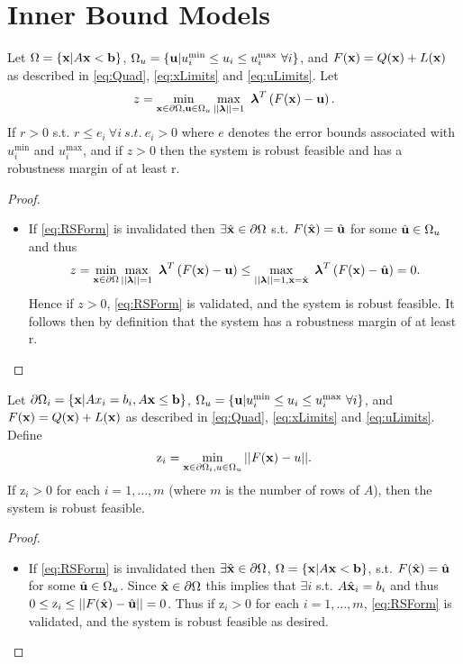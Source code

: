\section{Inner Bound Models} \label{sec:inbdform}  

\begin{thm}
Let $\Omega=\{\mathbf{x}| A\mathbf{x}< \mathbf{b}\}$, $\Omega_{u}=\{\mathbf{u}| u^{\min}_i\leq u_i \leq u^{\max}_i \ \forall i \}$, and $F(\mathbf{x})=Q(\mathbf{x})+L(\mathbf{x})$ as described in \eqref{eq:Quad}, \eqref{eq:xLimits} and \eqref{eq:uLimits}. 
Let
$$z = \min\limits_{\vx\in \partial \Omega, \vu\in \Omega_{u} }\max\limits_{||\boldsymbol{\lambda}||=1}\ \boldsymbol{\lambda}^T\left(F(\vx)-\vu\right).$$
If $r>0$ s.t. $r\leq e_i \ \forall i \ s.t. \ e_i>0$ where $e$ denotes the error bounds associated with $ u^{\min}_i$ and $ u^{\max}_i$, and if $z>0$ then the system is robust feasible and has a robustness margin of at least r.

\begin{proof} 
\begin{itemize}
\item[] If \eqref{eq:RSForm} is invalidated then $\exists \hat{\mathbf{x}}\in\partial\Omega$ s.t. $F(\hat{\mathbf{x}})=\hat{\mathbf{u}}$ for some $\hat{\mathbf{u}}\in\Omega_{u}$ and thus $$z = \min\limits_{\vx\in \partial \Omega}\max\limits_{||\boldsymbol{\lambda}||=1}\ \boldsymbol{\lambda}^T\left(F(\vx)-\vu\right)\leq \max\limits_{||\boldsymbol{\lambda}||=1, \vx=\hat{\vx}}\ \boldsymbol{\lambda}^T\left(F(\vx)-\hat{\vu}\right)=0.$$ 
Hence if $z>0$, \eqref{eq:RSForm} is validated, and the system is robust feasible. It follows then by definition that the system has a robustness margin of at least r.
\end{itemize}
\end{proof}
\end{thm}

\begin{thm} \label{thm:RobFeas}
Let $\partial\Omega_i=\{\mathbf{x}| Ax_i = b_i, A\mathbf{x}\leq \mathbf{b}\}$, $\Omega_{u}=\{\mathbf{u}| u^{\min}_i\leq u_i \leq u^{\max}_i \ \forall i \}$, and $F(\mathbf{x})=Q(\mathbf{x})+L(\mathbf{x})$ as described in \eqref{eq:Quad}, \eqref{eq:xLimits} and \eqref{eq:uLimits}. Define
\begin{align}
\mathrm{z}_i =  \min_{\mathbf{x}\in\partial\Omega_i, u\in \Omega_u} ||F(\mathbf{x})-u||. \label{eq:OPTfeas}
\end{align}
If $\mathrm{z}_i>0$ for each $i = 1, \ldots, m$ (where $m$ is the number of rows of $A$), then the system is robust feasible.

\begin{proof} 
\begin{itemize}
\item[] If \eqref{eq:RSForm} is invalidated then $\exists \hat{\mathbf{x}}\in\partial\Omega$, $\Omega=\{\mathbf{x}| A\mathbf{x}< \mathbf{b}\}$, s.t. $F(\hat{\mathbf{x}})=\hat{\mathbf{u}}$ for some $\hat{\mathbf{u}}\in \Omega_u$. 
Since $\hat{\mathbf{x}}\in\partial\Omega$ this implies that $\exists i$ s.t. $A\hat{\mathbf{x}}_i=b_i$ and thus $0\leq \mathrm{z}_i \leq ||F(\hat{\mathbf{x}})-\hat{\mathbf{u}}||=0$.
Thus if $\mathrm{z}_i>0$ for each $i = 1, \ldots, m$, \eqref{eq:RSForm} is validated, and the system is robust feasible as desired.
\end{itemize}
\end{proof}
\end{thm}

